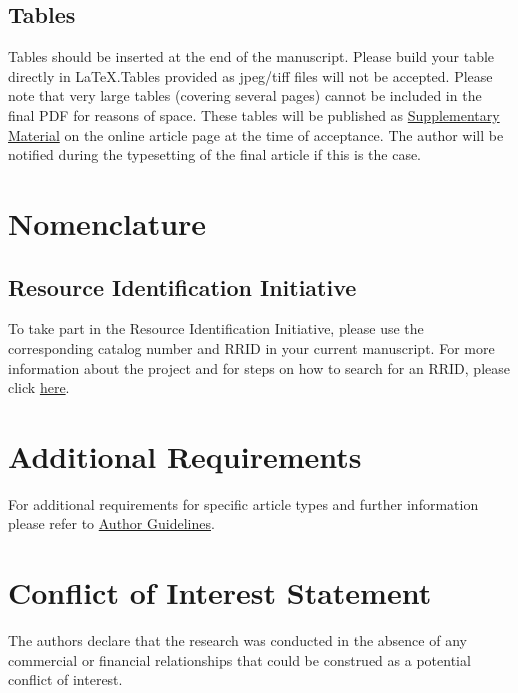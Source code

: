 \documentclass[utf8]{frontiersFPHY} %
\begin{document}
\subsection{Tables}
Tables should be inserted at the end of the manuscript. Please build your table directly in LaTeX.Tables provided as jpeg/tiff files will not be accepted. Please note that very large tables (covering several pages) cannot be included in the final PDF for reasons of space. These tables will be published as \href{http://home.frontiersin.org/about/author-guidelines#SupplementaryMaterial}{Supplementary Material} on the online article page at the time of acceptance. The author will be notified during the typesetting of the final article if this is the case. 

\section{Nomenclature}

\subsection{Resource Identification Initiative}
To take part in the Resource Identification Initiative, please use the corresponding catalog number and RRID in your current manuscript. For more information about the project and for steps on how to search for an RRID, please click \href{http://www.frontiersin.org/files/pdf/letter_to_author.pdf}{here}.


\section{Additional Requirements}

For additional requirements for specific article types and further information please refer to \href{http://www.frontiersin.org/about/AuthorGuidelines#AdditionalRequirements}{Author Guidelines}.

\section*{Conflict of Interest Statement}

The authors declare that the research was conducted in the absence of any commercial or financial relationships that could be construed as a potential conflict of interest.
\end{document}

